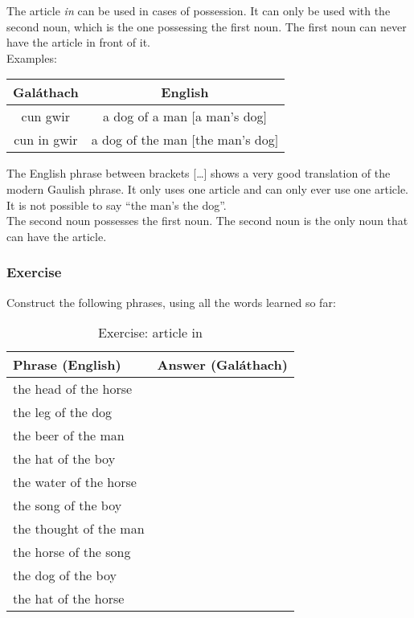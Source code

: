 The article \textit{in} can be used in cases of possession. It can only be used with the second noun, which is the one possessing the first noun. The first noun can never have the article in front of it.\\
Examples:
\begin{table}[H]
\centering
\begin{tabu}{c|c}
  \textbf{Gal\'{a}thach} & \textbf{English}\\
  \toprule
  cun gwir & a dog of a man $[$a man's dog$]$\\
  cun in gwir & a dog of the man $[$the man's dog$]$
\end{tabu}
\label{examples_possession_first_noun_no_particle_in_front}
\end{table}

The English phrase between brackets [\dots] shows a very good translation of the modern Gaulish phrase. It only uses one article and can only ever use one article. It is not possible to say ``the man's the dog''.\\

The second noun possesses the first noun. The second noun is the only noun that can have the article.

\newpage
\subsubsection{Exercise}

Construct the following phrases, using all the words learned so far:
\begin{table}[H]
\centering
\begin{tabu}{|l|p{10.0cm}|}
  \toprule
  \textbf{Phrase (English)} & \textbf{Answer (Gal\'{a}thach)}\\
  \toprule
  the head of the horse & \\
  \midrule
  the leg of the dog & \\
  \midrule
  the beer of the man & \\
  \midrule
  the hat of the boy & \\
  \midrule
  the water of the horse & \\
  \midrule
  the song of the boy & \\
  \midrule
  the thought of the man & \\
  \midrule
  the horse of the song & \\
  \midrule
  the dog of the boy & \\
  \midrule
  the hat of the horse & \\
  \bottomrule
\end{tabu}
\label{exercise_article_in}
\caption{Exercise: article in}
\end{table}

